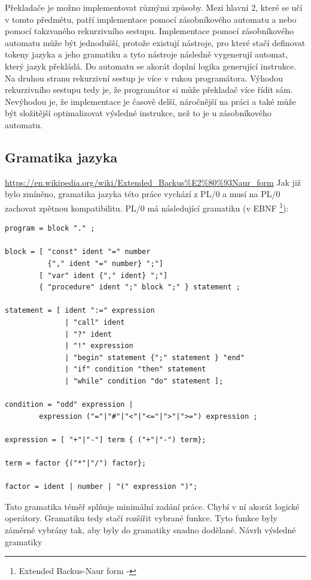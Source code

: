 \documentclass[12pt, letterpaper]{article}
\begin{document}
Překladače je možno implementovat různými způsoby. Mezi hlavní 2, které se učí v tomto předmětu, patří implementace pomocí
zásobníkového automatu a nebo pomocí takzvaného rekurzivního sestupu. Implementace pomocí zásobníkového automatu může
být jednodušší, protože existují nástroje, pro které stačí definovat tokeny jazyka a jeho gramatiku a tyto nástroje
následně vygenerují automat, který jazyk překládá. Do automatu se akorát doplní logika generující instrukce. Na druhou
stranu rekurzivní sestup je více v rukou programátora. Výhodou rekurzivního sestupu tedy je, že programátor si může
překladač více řídit sám. Nevýhodou je, že implementace je časově delší, náročnější na práci a také může být složitější
optimalizovat výsledné instrukce, než to je u zásobníkového automatu.
%
\subsection{Gramatika jazyka}
\urldef{\urlA}\url{https://en.wikipedia.org/wiki/Extended_Backus%E2%80%93Naur_form}
Jak již bylo zmíněno, gramatika jazyka této práce vychází z PL/0 a musí na PL/0 zachovat zpětnou kompatibilitu.
PL/0 má následující gramatiku (v EBNF
\footnote{Extended Backus-Naur form - \urlA}):
%
\begin{lstlisting}[caption=Originální PL/0 gramatika, captionpos=b]
program = block "." ;

block = [ "const" ident "=" number 
          {"," ident "=" number} ";"]
        [ "var" ident {"," ident} ";"]
        { "procedure" ident ";" block ";" } statement ;

statement = [ ident ":=" expression 
              | "call" ident 
              | "?" ident 
              | "!" expression 
              | "begin" statement {";" statement } "end" 
              | "if" condition "then" statement 
              | "while" condition "do" statement ];

condition = "odd" expression |
        expression ("="|"#"|"<"|"<="|">"|">=") expression ;

expression = [ "+"|"-"] term { ("+"|"-") term};

term = factor {("*"|"/") factor};

factor = ident | number | "(" expression ")";
\end{lstlisting}
%
Tato gramatika téměř splňuje minimální zadání práce. Chybí v ní akorát logické operátory. Gramatiku tedy stačí rozšířit
vybrané funkce. Tyto funkce byly záměrně vybrány tak, aby byly do gramatiky snadno dodělané. Návrh výsledné gramatiky
\end{document}
